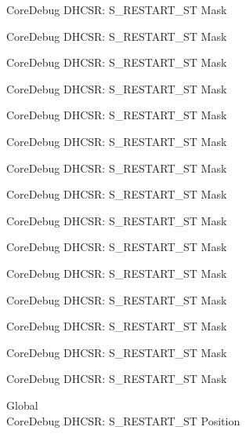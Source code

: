 \begin{DoxyRefList}
\label{deprecated__deprecated000108}%
%
Core\+Debug DHCSR\+: S\+\_\+\+RESTART\+\_\+\+ST Mask 

\label{deprecated__deprecated000162}%
%
Core\+Debug DHCSR\+: S\+\_\+\+RESTART\+\_\+\+ST Mask 

\label{deprecated__deprecated000247}%
%
Core\+Debug DHCSR\+: S\+\_\+\+RESTART\+\_\+\+ST Mask 

\label{deprecated__deprecated000304}%
%
Core\+Debug DHCSR\+: S\+\_\+\+RESTART\+\_\+\+ST Mask 

\label{deprecated__deprecated000380}%
%
Core\+Debug DHCSR\+: S\+\_\+\+RESTART\+\_\+\+ST Mask 

\label{deprecated__deprecated000459}%
%
Core\+Debug DHCSR\+: S\+\_\+\+RESTART\+\_\+\+ST Mask 

\label{deprecated__deprecated000561}%
%
Core\+Debug DHCSR\+: S\+\_\+\+RESTART\+\_\+\+ST Mask 

\label{deprecated__deprecated000686}%
%
Core\+Debug DHCSR\+: S\+\_\+\+RESTART\+\_\+\+ST Mask 

\label{deprecated__deprecated000786}%
%
Core\+Debug DHCSR\+: S\+\_\+\+RESTART\+\_\+\+ST Mask 

\label{deprecated__deprecated000840}%
%
Core\+Debug DHCSR\+: S\+\_\+\+RESTART\+\_\+\+ST Mask 

\label{deprecated__deprecated000925}%
%
Core\+Debug DHCSR\+: S\+\_\+\+RESTART\+\_\+\+ST Mask 

\label{deprecated__deprecated000982}%
%
Core\+Debug DHCSR\+: S\+\_\+\+RESTART\+\_\+\+ST Mask 

\label{deprecated__deprecated001058}%
%
Core\+Debug DHCSR\+: S\+\_\+\+RESTART\+\_\+\+ST Mask 

\label{deprecated__deprecated001137}%
%
Core\+Debug DHCSR\+: S\+\_\+\+RESTART\+\_\+\+ST Mask 

\label{deprecated__deprecated001239}%
%
Core\+Debug DHCSR\+: S\+\_\+\+RESTART\+\_\+\+ST Mask  
\item[Global \doxylink{group___c_m_s_i_s___s_c_b_gaf6498d32dbe23b8d95a12d2fbc0a65f8}{Core\+Debug\+\_\+\+DHCSR\+\_\+\+S\+\_\+\+RESTART\+\_\+\+ST\+\_\+\+Pos} ]\hfill \\
\label{deprecated__deprecated000007}%
%
Core\+Debug DHCSR\+: S\+\_\+\+RESTART\+\_\+\+ST Position 


\end{DoxyRefList}
